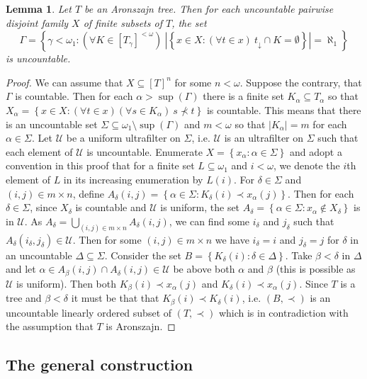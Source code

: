 \documentclass{amsart}
\theoremstyle{plain}
\newtheorem{lemma}[theorem]{Lemma}
\theoremstyle{definition}
\numberwithin{equation}{section}
\renewcommand{\a}{\alpha}
\renewcommand{\b}{\beta}
\newcommand{\g}{\gamma}
\renewcommand{\d}{\delta}
\renewcommand{\o}{\omega}
\newcommand{\ps}{\emptyset}
\newcommand{\sst}{\subseteq}
\newcommand{\cu}{\mathcal U}
\newcommand{\set}[1]{\left\{#1\right\}}
\newcommand{\abs}[1]{\left\vert#1\right\vert}
\begin{document}
\begin{lemma}\label{l:handbook}
	Let $T$ be an Aronszajn tree.
	Then for each uncountable pairwise disjoint family $X$ of finite subsets of $T$, the set $$\Gamma=\set{\g<\o_1:(\forall K\in [T_{\g}]^{<\o})\ \abs{\set{x\in X: (\forall t\in x)\ t_{\downarrow}\cap K=\ps}}=\aleph_1}$$ is uncountable. 
\end{lemma}
\begin{proof}
	We can assume that $X\sst [T]^n$ for some $n<\o$.
	Suppose the contrary, that $\Gamma$ is countable.
	Then for each $\a>\sup(\Gamma)$ there is a finite set $K_{\a}\sst T_{\a}$ so that $X_{\a}=\set{x\in X:(\forall t\in x)(\forall s\in K_{\a})\ s\not\prec t}$ is countable.
	This means that there is an uncountable set $\Sigma\sst \o_1\setminus\sup(\Gamma)$ and $m<\o$ so that $\abs{K_{\a}}=m$ for each $\a\in\Sigma$.
	Let $\cu$ be a uniform ultrafilter on $\Sigma$, i.e. $\cu$ is an ultrafilter on $\Sigma$ such that each element of $\cu$ is uncountable.
	Enumerate $X=\set{x_{\a}:\a\in\Sigma}$ and adopt a convention in this proof that for a finite set $L\sst\o_1$ and $i<\o$, we denote the $i$th element of $L$ in its increasing enumeration by $L(i)$.
	For $\d\in\Sigma$ and $(i,j)\in m\times n$, define $A_{\d}(i,j)=\set{\a\in\Sigma:K_{\d}(i)\prec x_{\a}(j)}$.
	Then for each $\d\in\Sigma$, since $X_{\d}$ is countable and $\cu$ is uniform, the set $A_{\d}=\set{\a\in\Sigma:x_{\a}\notin X_{\d}}$ is in $\cu$.
	As $A_{\d}=\bigcup_{(i,j)\in m\times n}A_{\d}(i,j)$, we can find some $i_{\d}$ and $j_{\d}$ such that $A_{\d}(i_{\d},j_{\d})\in\cu$.
	Then for some $(i,j)\in m\times n$ we have $i_{\d}=i$ and $j_{\d}=j$ for $\d$ in an uncountable $\Delta\sst\Sigma$.
	Consider the set $B=\set{K_{\d}(i):\d\in\Delta}$.
	Take $\b<\d$ in $\Delta$ and let $\a\in A_{\b}(i,j)\cap A_{\d}(i,j)\in \cu$ be above both $\a$ and $\b$ (this is possible as $\cu$ is uniform).
	Then both $K_{\b}(i)\prec x_{\a}(j)$ and $K_{\d}(i)\prec x_{\a}(j)$.
	Since $T$ is a tree and $\b<\d$ it must be that that $K_{\b}(i)\prec K_{\d}(i)$, i.e. $(B,\prec)$ is an uncountable linearly ordered subset of $(T,\prec)$ which is in contradiction with the assumption that $T$ is Aronszajn.
\end{proof}

\subsection{The general construction}
\end{document}

